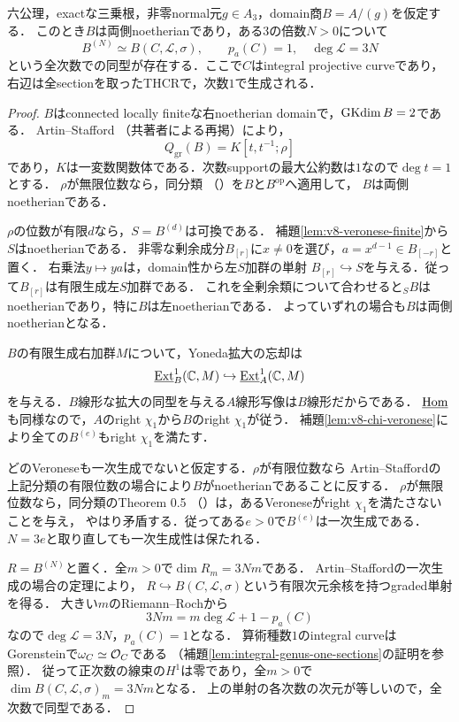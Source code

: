 \documentclass[11pt,a4paper]{ltjsarticle}
\begin{document}
\begin{proposition}[整な三次境界の両側noetherian性と高Veronese]
\label{prop:v8-cubic-high-veronese}
六公理，exactな三乗根，非零normal元$g\in A_3$，domain商$B=A/(g)$を仮定する．
このとき$B$は両側noetherianであり，ある$3$の倍数$N>0$について
\[
 B^{(N)}\simeq B(C,\mathcal L,\sigma),\qquad
 p_a(C)=1,\quad\deg\mathcal L=3N
\]
という全次数での同型が存在する．ここで$C$はintegral projective curveであり，
右辺は全sectionを取ったTHCRで，次数$1$で生成される．
\end{proposition}
\begin{proof}
$B$はconnected locally finiteな右noetherian domainで，$\operatorname{GKdim} B=2$である．
Artin--Stafford\cite[Theorem 0.1]{ASquadratic}
（共著者による再掲\cite[Theorem 5.1]{SVdBsurvey}）により，
\[
 Q_{\mathrm{gr}}(B)=K[t,t^{-1};\rho]
\]
であり，$K$は一変数関数体である．次数supportの最大公約数は$1$なので$\deg t=1$とする．
$\rho$が無限位数なら，同分類\cite[Theorem 0.4]{ASquadratic}
（\cite[Theorem 5.5(i)]{SVdBsurvey}）を$B$と$B^{\mathrm{op}}$へ適用して，
$B$は両側noetherianである．

$\rho$の位数が有限$d$なら，$S=B^{(d)}$は可換である．
補題\ref{lem:v8-veronese-finite}から$S$はnoetherianである．
非零な剰余成分$B_{[r]}$に$x\ne0$を選び，$a=x^{d-1}\in B_{[-r]}$と置く．
右乗法$y\mapsto ya$は，domain性から左$S$加群の単射
$B_{[r]}\hookrightarrow S$を与える．従って$B_{[r]}$は有限生成左$S$加群である．
これを全剰余類について合わせると${}_SB$はnoetherianであり，特に$B$は左noetherianである．
よっていずれの場合も$B$は両側noetherianとなる．

$B$の有限生成右加群$M$について，Yoneda拡大の忘却は
\[
 \underline{\operatorname{Ext}}_B^1(\mathbb C,M)\hookrightarrow
 \underline{\operatorname{Ext}}_A^1(\mathbb C,M)
\]
を与える．$B$線形な拡大の同型を与える$A$線形写像は$B$線形だからである．
$\underline{\operatorname{Hom}}$も同様なので，$A$のright $\chi_1$から$B$のright $\chi_1$が従う．
補題\ref{lem:v8-chi-veronese}により全ての$B^{(e)}$もright $\chi_1$を満たす．

どのVeroneseも一次生成でないと仮定する．$\rho$が有限位数なら
Artin--Staffordの上記分類の有限位数の場合により$B$がnoetherianであることに反する．
$\rho$が無限位数なら，同分類のTheorem 0.5
（\cite[Theorem 5.6]{SVdBsurvey}）は，あるVeroneseがright $\chi_1$を満たさないことを与え，
やはり矛盾する．従ってある$e>0$で$B^{(e)}$は一次生成である．
$N=3e$と取り直しても一次生成性は保たれる．

$R=B^{(N)}$と置く．全$m>0$で$\dim R_m=3Nm$である．
Artin--Staffordの一次生成の場合の定理\cite[Theorem 0.2]{ASquadratic}により，
$R\hookrightarrow B(C,\mathcal L,\sigma)$という有限次元余核を持つgraded単射を得る．
大きい$m$のRiemann--Rochから
\[
 3Nm=m\deg\mathcal L+1-p_a(C)
\]
なので$\deg\mathcal L=3N$，$p_a(C)=1$となる．
算術種数$1$のintegral curveはGorensteinで$\omega_C\simeq\mathcal O_C$である
（補題\ref{lem:integral-genus-one-sections}の証明を参照）．
従って正次数の線束の$H^1$は零であり，全$m>0$で
$\dim B(C,\mathcal L,\sigma)_m=3Nm$となる．
上の単射の各次数の次元が等しいので，全次数で同型である．
\end{proof}
\end{document}
